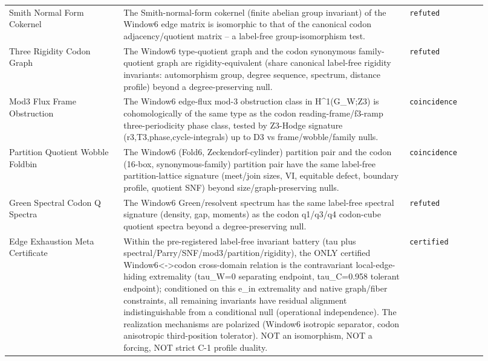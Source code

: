 \begin{longtable}{>{\raggedright\arraybackslash}p{0.22\linewidth}>{\raggedright\arraybackslash}p{0.55\linewidth}>{\raggedright\arraybackslash}p{0.15\linewidth}}
Smith Normal Form Cokernel & The Smith-normal-form cokernel (finite abelian group invariant) of the Window6 edge matrix is isomorphic to that of the canonical codon adjacency/quotient matrix -- a label-free group-isomorphism test. & \texttt{refuted} \\
Three Rigidity Codon Graph & The Window6 type-quotient graph and the codon synonymous family-quotient graph are rigidity-equivalent (share canonical label-free rigidity invariants: automorphism group, degree sequence, spectrum, distance profile) beyond a degree-preserving null. & \texttt{refuted} \\
Mod3 Flux Frame Obstruction & The Window6 edge-flux mod-3 obstruction class in H\textasciicircum{}1(G\_W;Z3) is cohomologically of the same type as the codon reading-frame/f3-ramp three-periodicity phase class, tested by Z3-Hodge signature (r3,T3,phase,cycle-integrals) up to D3 vs frame/wobble/family nulls. & \texttt{coincidence} \\
Partition Quotient Wobble Foldbin & The Window6 (Fold6, Zeckendorf-cylinder) partition pair and the codon (16-box, synonymous-family) partition pair have the same label-free partition-lattice signature (meet/join sizes, VI, equitable defect, boundary profile, quotient SNF) beyond size/graph-preserving nulls. & \texttt{coincidence} \\
Green Spectral Codon Q Spectra & The Window6 Green/resolvent spectrum has the same label-free spectral signature (density, gap, moments) as the codon q1/q3/q4 codon-cube quotient spectra beyond a degree-preserving null. & \texttt{refuted} \\
Edge Exhaustion Meta Certificate & Within the pre-registered label-free invariant battery (tau plus spectral/Parry/SNF/mod3/partition/rigidity), the ONLY certified Window6<->codon cross-domain relation is the contravariant local-edge-hiding extremality (tau\_W=0 separating endpoint, tau\_C=0.958 tolerant endpoint); conditioned on this e\_in extremality and native graph/fiber constraints, all remaining invariants have residual alignment indistinguishable from a conditional null (operational independence). The realization mechanisms are polarized (Window6 isotropic separator, codon anisotropic third-position tolerator). NOT an isomorphism, NOT a forcing, NOT strict C-1 profile duality. & \texttt{certified} \\

\end{longtable}
